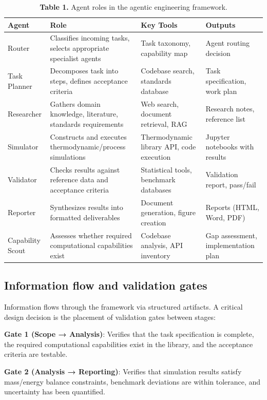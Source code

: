 \documentclass[review,3p]{elsarticle}
\begin{document}
\begin{table}[htbp]
\centering
\caption{\textbf{Table 1.} Agent roles in the agentic engineering framework.}
\begin{tabular}{llll}
\toprule
Agent & Role & Key Tools & Outputs \\
\midrule
Router & Classifies incoming tasks, selects appropriate specialist agents & Task taxonomy, capability map & Agent routing decision \\
Task Planner & Decomposes task into steps, defines acceptance criteria & Codebase search, standards database & Task specification, work plan \\
Researcher & Gathers domain knowledge, literature, standards requirements & Web search, document retrieval, RAG & Research notes, reference list \\
Simulator & Constructs and executes thermodynamic/process simulations & Thermodynamic library API, code execution & Jupyter notebooks with results \\
Validator & Checks results against reference data and acceptance criteria & Statistical tools, benchmark databases & Validation report, pass/fail \\
Reporter & Synthesizes results into formatted deliverables & Document generation, figure creation & Reports (HTML, Word, PDF) \\
Capability Scout & Assesses whether required computational capabilities exist & Codebase analysis, API inventory & Gap assessment, implementation plan \\
\bottomrule
\end{tabular}
\end{table}

\subsection{Information flow and validation gates}

Information flows through the framework via structured artifacts. A critical design decision is the placement of validation gates between stages:

\textbf{Gate 1 (Scope → Analysis)}: Verifies that the task specification is complete, the required computational capabilities exist in the library, and the acceptance criteria are testable.

\textbf{Gate 2 (Analysis → Reporting)}: Verifies that simulation results satisfy mass/energy balance constraints, benchmark deviations are within tolerance, and uncertainty has been quantified.
\end{document}
